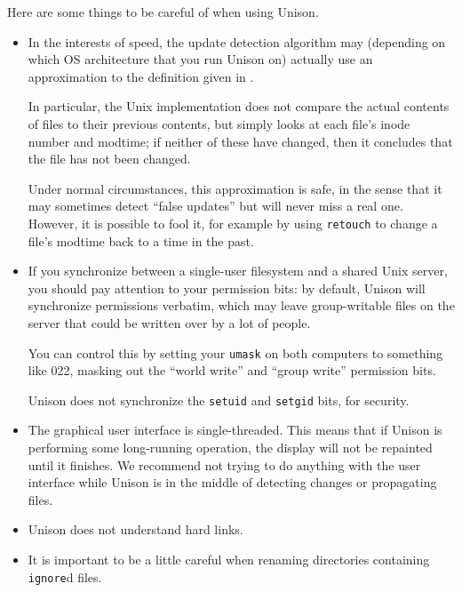 \documentclass{article}
\begin{document}

Here are some things to be careful of when using Unison.

\begin{itemize}
\item In the interests of speed, the update detection algorithm may
  (depending on which OS architecture that you run Unison on)
  actually use an approximation to the definition given in
  .

  In particular, the Unix
  implementation does not compare the actual contents of files to their
  previous contents, but simply looks at each file's inode number and
  modtime; if neither of these have changed, then it concludes that the
  file has not been changed.

  Under normal circumstances, this approximation is safe, in the sense
  that it may sometimes detect ``false updates'' but will never miss a real
  one.  However, it is possible to fool it, for example by using
  \verb|retouch| to change a file's modtime back to a time in the past.

\item If you synchronize between a single-user filesystem and a shared
Unix server, you should pay attention to your permission bits: by
default, Unison will synchronize permissions verbatim, which may leave
group-writable files on the server that could be written over by a lot of
people.

You can control this by setting your \verb|umask| on both computers to
something like 022, masking out the ``world write'' and ``group write''
permission bits.

Unison does not synchronize the \verb|setuid| and \verb|setgid| bits, for
security.

\item The graphical user interface is single-threaded.  This
means that if Unison is performing some long-running operation, the
display will not be repainted until it finishes.  We recommend not
trying to do anything with the user interface while Unison is in the
middle of detecting changes or propagating files.

\item Unison does not understand hard links.

\item It is important to be a little careful when renaming directories
containing {\tt ignore}d files.


\end{itemize}
\end{document}
